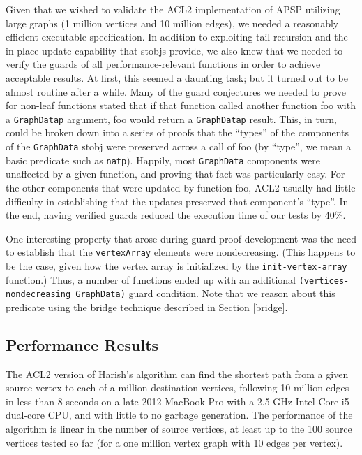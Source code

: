 \documentclass[copyright]{eptcs}
\begin{document}
Given that we wished to validate the ACL2 implementation of APSP
utilizing large graphs (1 million vertices and 10 million edges), we 
needed a reasonably efficient executable specification.  In addition
to exploiting tail recursion and the in-place update capability that
stobjs provide, we also knew that we needed to verify the guards 
of all performance-relevant functions in order to achieve acceptable 
results.  At first, this seemed a daunting task; but it turned out 
to be almost routine after a while.  Many of the guard conjectures we
needed to prove for non-leaf functions stated that if that function 
called another function foo with a \texttt{GraphDatap} argument, 
foo would return a \texttt{GraphDatap} result.  This, in turn, could
be broken down into a series of proofs that the ``types'' of the
components of the \texttt{GraphData} stobj were preserved across a 
call of foo (by ``type'', we mean a basic predicate such as
\texttt{natp}).  Happily, most \texttt{GraphData} components were
unaffected by a given function, and proving that fact was 
particularly easy.  For the other components that were 
updated by function foo, ACL2 usually had little difficulty in
establishing that the updates preserved that component's
``type''.  In the end, having verified guards reduced the execution
time of our tests by 40\%.

One interesting property that arose during guard proof development 
was the need to establish that the \texttt{vertexArray} elements were 
nondecreasing.  (This happens to be the case, given how the vertex
array is initialized by the \texttt{init-vertex-array} function.)
Thus, a number of functions ended up with an additional 
\texttt{(vertices-nondecreasing GraphData)} guard condition.  
Note that we reason about this predicate using the bridge technique 
described in Section \ref{bridge}.

\subsection{Performance Results}

The ACL2 version of Harish's algorithm can find the shortest path 
from a given source vertex to each of a million destination vertices, 
following 10 million edges in less than 8 seconds on a late 2012 
MacBook Pro with a 2.5 GHz Intel Core i5 dual-core CPU, and with 
little to no garbage generation.  The performance of the algorithm is linear 
in the number of source vertices, at least up to the 100 source
vertices tested so far (for a one million vertex graph with 10 edges 
per vertex).
\end{document}
